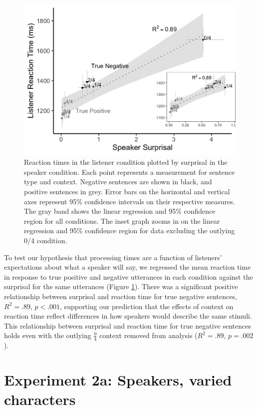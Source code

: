 \documentclass[man, floatsintext, noapacite]{apa6}
\begin{document}
\begin{figure}[t]
\begin{center} 
\includegraphics[width=5in]{figures/experiment1/speaker_v_listener.png}
\caption{\label{fig:exp1_scatter} Reaction times in the listener condition plotted by surprisal in the speaker condition. Each point represents a measurement for sentence type and context. Negative sentences are shown in black, and positive sentences in grey. Error bars on the horizontal and vertical axes represent 95\% confidence intervals on their respective measures. The gray band shows the linear regression and  95\% confidence region for all conditions. The inset graph zooms in on the linear regression and 95\% confidence region for data excluding the outlying 0/4 condition.}
\end{center} 
\end{figure}

To test our hypothesis that processing times are a function of listeners' expectations about what a speaker will say, we regressed the mean reaction time in response to true positive and negative utterances in each condition against the surprisal for the same utterances (Figure \ref{fig:exp1_scatter}).  There was a significant positive relationship between surprisal and reaction time for true negative sentences, $R^2=.89$, $p<.001$, supporting our prediction that the effects of context on reaction time reflect differences in how speakers would describe the same stimuli. This relationship between surprisal and reaction time for true negative sentences holds even with the outlying $\frac{0}{4}$ context removed from analysis ($R^2=.89$, $p = .002$).


\section{Experiment 2a: Speakers, varied characters}
\end{document}
